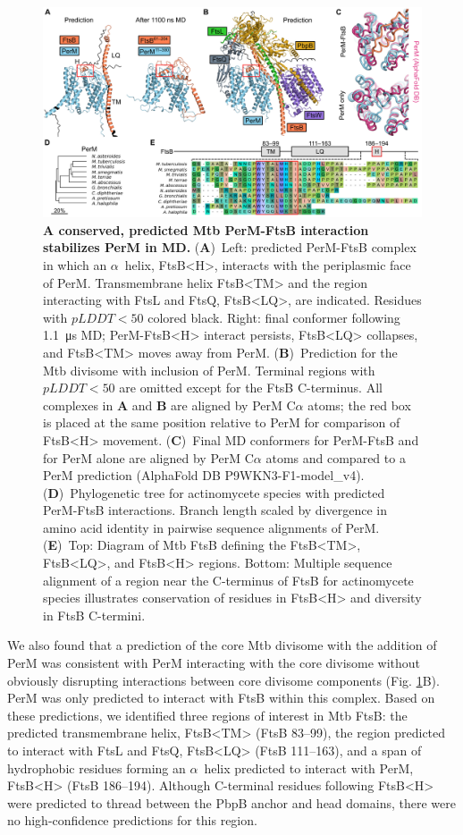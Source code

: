 \documentclass[twocolumn,pdflatex,sn-nature]{sn-jnl}%
\def\textsuperscript#1{<#1>}%
\newcommand\mtb{Mtb}
\newcommand\ftsbTM{FtsB\textsuperscript{TM}}
\newcommand\ftsbLQ{FtsB\textsuperscript{LQ}}
\newcommand\ftsbH{FtsB\textsuperscript{H}}
\begin{document}
\begin{figure}[htb]
\centering
\includegraphics[width=1.0\textwidth]{../figures/fig1_1.png}
\caption{
    \textbf{A conserved, predicted \mtb{} PerM-FtsB interaction stabilizes PerM in MD.}
    (\textbf{A})~Left: predicted PerM-FtsB complex in which an $\alpha$~helix, \ftsbH{}, interacts with the periplasmic face of PerM. Transmembrane helix \ftsbTM{} and the region interacting with FtsL and FtsQ, \ftsbLQ{}, are indicated. Residues with $pLDDT < 50$ colored black. Right: final conformer following \qty{1.1}{\us} MD; PerM-\ftsbH{} interact persists, \ftsbLQ{} collapses, and \ftsbTM{} moves away from PerM.
    (\textbf{B})~Prediction for the \mtb{} divisome with inclusion of PerM. Terminal regions with $pLDDT < 50$ are omitted except for the FtsB C-terminus. All complexes in \textbf{A} and \textbf{B} are aligned by PerM C$\alpha$ atoms; the red box is placed at the same position relative to PerM for comparison of \ftsbH{} movement.
    (\textbf{C})~Final MD conformers for PerM-FtsB and for PerM alone are aligned by PerM C$\alpha$ atoms and compared to a PerM prediction  (AlphaFold DB P9WKN3-F1-model{\_}v4).
    (\textbf{D})~Phylogenetic tree for actinomycete species with predicted PerM-FtsB interactions. Branch length scaled by divergence in amino acid identity in pairwise sequence alignments of PerM.
    (\textbf{E})~Top: Diagram of \mtb{} FtsB defining the \ftsbTM{}, \ftsbLQ{}, and \ftsbH{} regions. Bottom: Multiple sequence alignment of a region near the C-terminus of FtsB for actinomycete species illustrates conservation of residues in \ftsbH{} and diversity in FtsB C-termini.
}\label{fig1_1}
\end{figure}

We also found that a prediction of the core \mtb{} divisome with the addition of PerM was consistent with PerM interacting with the core divisome without obviously disrupting interactions between core divisome components (Fig. \ref{fig1_1}B).
PerM was only predicted to interact with FtsB within this complex. Based on these predictions, we identified three regions of interest in \mtb{} FtsB: the predicted transmembrane helix, \ftsbTM{} (FtsB 83--99), the region predicted to interact with FtsL and FtsQ, \ftsbLQ{} (FtsB 111--163), and a span of hydrophobic residues forming an $\alpha$~helix predicted to interact with PerM, \ftsbH{} (FtsB 186--194).
Although C-terminal residues following \ftsbH{} were predicted to thread between the PbpB anchor and head domains, there were no high-confidence predictions for this region.
\end{document}
